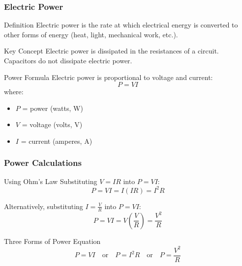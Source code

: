 \documentclass{beamer}
\begin{document}
\begin{frame}
    \frametitle{Electric Power}
    \begin{block}{Definition}
        Electric power is the rate at which electrical energy is converted to other forms of energy (heat, light, mechanical work, etc.).
    \end{block}
    
    \begin{block}{Key Concept}
        Electric power is dissipated in the resistances of a circuit. Capacitors do not dissipate electric power.
    \end{block}
    
    \begin{block}{Power Formula}
        Electric power is proportional to voltage and current:
        \begin{equation}
            P = VI
        \end{equation}
        where:
        \begin{itemize}
            \item $P$ = power (watts, W)
            \item $V$ = voltage (volts, V)
            \item $I$ = current (amperes, A)
        \end{itemize}
    \end{block}
\end{frame}

\begin{frame}
    \frametitle{Power Calculations}
    \begin{block}{Using Ohm's Law}
        Substituting $V = IR$ into $P = VI$:
        \begin{equation}
            P = VI = I(IR) = I^2R
        \end{equation}
        
        Alternatively, substituting $I = \frac{V}{R}$ into $P = VI$:
        \begin{equation}
            P = VI = V\left(\frac{V}{R}\right) = \frac{V^2}{R}
        \end{equation}
    \end{block}
    
    \begin{block}{Three Forms of Power Equation}
        \begin{equation}
            P = VI \quad \text{or} \quad P = I^2R \quad \text{or} \quad P = \frac{V^2}{R}
        \end{equation}
    \end{block}
\end{frame}
\end{document}
